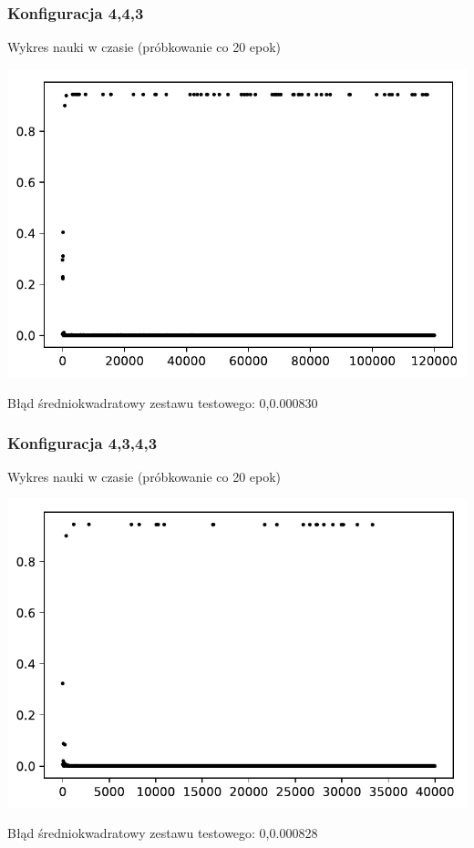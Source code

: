 \documentclass{classrep}
\begin{document}
\subsubsection{Konfiguracja 4,4,3}
Wykres nauki w czasie (próbkowanie co 20 epok)
\begin{center}
 \includegraphics{output_0_1.pdf}
\end{center}
Błąd średniokwadratowy zestawu testowego: 0,0.000830
\subsubsection{Konfiguracja 4,3,4,3}
Wykres nauki w czasie (próbkowanie co 20 epok)
\begin{center}
 \includegraphics{output_0_2.pdf}
\end{center}
Błąd średniokwadratowy zestawu testowego: 0,0.000828
\newpage
\end{document}
